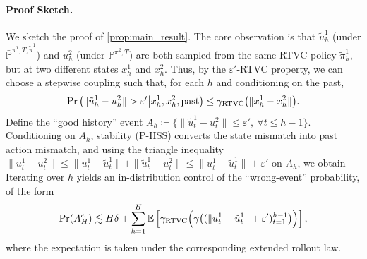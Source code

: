 \documentclass{article}
\newcommand{\arxiv}[1]{\iftoggle{icml}{}{#1}}
\newcommand{\icml}[1]{\iftoggle{icml}{#1}{}}
\let\oldparagraph\paragraph
\renewcommand{\paragraph}[1]{\oldparagraph{#1.}}
\begin{document}
\paragraph{Proof Sketch}
We sketch the proof of \cref{prop:main_result}. The core observation is that $\tilde u_h^1$ (under $\bar{\mathbb P}^{\pi^1, T,\tilde \pi^1}$) and $u_h^2$ (under $\mathbb P^{\pi^2, T}$) are both sampled from the same RTVC policy $\tilde \pi^1_h$, but at two different states $x_h^1$ and $x_h^2$. Thus, by the $\varepsilon'$-RTVC property, we can choose a stepwise coupling such that, for each $h$ and conditioning on the past,
\begin{equation*}
\Pr\left(\|\tilde u_h^1-u_h^2\|>\varepsilon' \middle| x_h^1,x_h^2,\text{past}\right)
\le
\gamma_{\textnormal{RTVC}}\big(\|x_h^1-x_h^2\|\big).
\end{equation*}
Define the “good history” event $A_h\coloneqq \{\|\tilde u_t^1-u_t^2\|\le \varepsilon',\ \forall t\le h-1\}$. Conditioning on $A_h$, stability (P-IISS) converts the state mismatch into past action mismatch, and using the triangle inequality
$\|u_t^1-u_t^2\|\le \|u_t^1-\tilde u_t^1\|+\|\tilde u_t^1-u_t^2\|\le \|u_t^1-\tilde u_t^1\|+\varepsilon'$ on $A_h$, we obtain
\icml{
\begin{equation*}
\begin{aligned}
&\Pr\left(\|\tilde u_h^1-u_h^2\|>\varepsilon' \mid A_h\right)
\le
\mathbb E\left[\gamma_{\textnormal{RTVC}}\big(\|x_h^1-x_h^2\|\big)\middle|A_h\right] \\&
\stackrel{\text{(P-IISS)}}{\lesssim}
\mathbb E\left[
\gamma_{\textnormal{RTVC}}\Big(
\gamma\big( (\|u_t^1-\tilde u_t^1\|+\varepsilon')_{t=1}^{h-1}\big)
\Big)
\middle|
A_h\right]
+\delta.
\end{aligned}
\end{equation*}
}
\arxiv{
\begin{equation*}
\begin{aligned}
\Pr\left(\|\tilde u_h^1-u_h^2\|>\varepsilon' \mid A_h\right)
&\le
\mathbb E\left[\gamma_{\textnormal{RTVC}}\big(\|x_h^1-x_h^2\|\big)\middle|A_h\right] \\&
\stackrel{\text{(P-IISS)}}{\lesssim}
\mathbb E\left[
\gamma_{\textnormal{RTVC}}\Big(
\gamma\big( (\|u_t^1-\tilde u_t^1\|+\varepsilon')_{t=1}^{h-1}\big)
\Big)
\middle|
A_h\right]
+\delta.
\end{aligned}
\end{equation*}
}
Iterating over $h$ yields an in-distribution control of the “wrong-event” probability, of the form
\begin{equation*}
\Pr(A_{H}^c)
\lesssim
H\delta
+
\sum_{h=1}^{H}
\mathbb E\left[
\gamma_{\textnormal{RTVC}}\Big(
\gamma\big( (\|u_t^1-\tilde u_t^1\|+\varepsilon')_{t=1}^{h-1}\big)
\Big)
\right],
\end{equation*}
where the expectation is taken under the corresponding extended rollout law.
\end{document}
